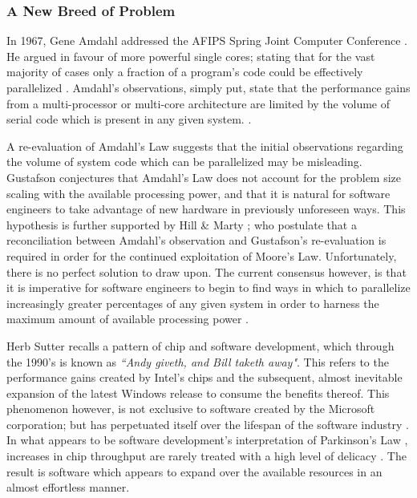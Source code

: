 \documentclass[12pt,a4paper]{article}
\begin{document}
\subsubsection{A New Breed of Problem}

In 1967, Gene Amdahl addressed the AFIPS Spring Joint Computer Conference \cite{amdahl}. He argued in favour of more powerful single cores; stating that for the vast majority of cases only a fraction of a program's code could be effectively parallelized \cite{amdahl}. Amdahl's observations, simply put, state that the performance gains from a multi-processor or multi-core architecture are limited by the volume of serial code which is present in any given system. \cite{thousandCoreChips}.

A re-evaluation of Amdahl's Law \cite{reevaluateAmdahl} suggests that the initial observations regarding the volume of system code which can be parallelized may be misleading. Gustafson \cite{reevaluateAmdahl} conjectures that Amdahl's Law does not account for the problem size scaling with the available processing power, and that it is natural for software engineers to take advantage of new hardware in previously unforeseen ways. This hypothesis is further supported by Hill \& Marty \cite{amdahlsLawMultiCore}; who postulate that a reconciliation between Amdahl's observation and Gustafson's re-evaluation is required in order for the continued exploitation of Moore's Law. Unfortunately, there is no perfect solution to draw upon. The current consensus however, is that it is imperative for software engineers to begin to find ways in which to parallelize increasingly greater percentages of any given system in order to harness the maximum amount of available processing power \cite{reevaluateAmdahl,thousandCoreChips,amdahlsLawMultiCore}.

Herb Sutter \cite{theFreeLunchIsOver} recalls a pattern of chip and software development, which through the 1990's is known as \textit{``Andy giveth, and Bill taketh away"}. This refers to the performance gains created by Intel's chips and the subsequent, almost inevitable expansion of the latest Windows release to consume the benefits thereof. This phenomenon however, is not exclusive to software created by the Microsoft corporation; but has perpetuated itself over the lifespan of the software industry \cite{theFreeLunchIsOver}. In what appears to be software development's interpretation of Parkinson's Law \cite{parkinsonsLaw}, increases in chip throughput are rarely treated with a high level of delicacy \cite{theFreeLunchIsOver}. The result is software which appears to expand over the available resources in an almost effortless manner.
\end{document}
